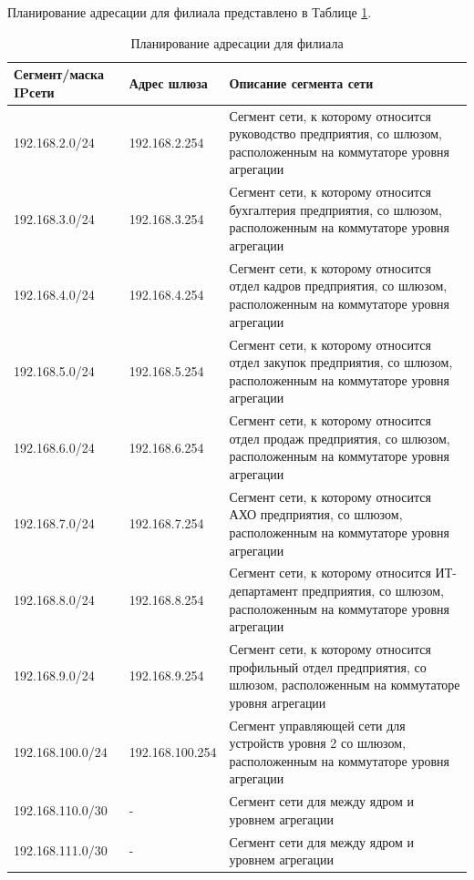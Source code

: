 \documentclass[14pt, a4paper]{extarticle}
\numberwithin{equation}{section}
\begin{document}
Планирование адресации для филиала представлено в Таблице \ref{table:filialIpPlan}.
\begin{table}[H]
\centering
\small
\caption{Планирование адресации для филиала}
\label{table:filialIpPlan}
\begin{tabular}{|m{4cm}|m{3cm}|m{8cm}|}
\hline
\textbf{Сегмент/маска IPсети} & \textbf{Адрес шлюза} & \textbf{Описание сегмента сети} \\
\hline
192.168.2.0/24 & 192.168.2.254 & Сегмент сети, к которому относится руководство предприятия, со шлюзом, расположенным на коммутаторе уровня агрегации
\\ \hline
192.168.3.0/24 & 192.168.3.254 & Сегмент сети, к которому относится бухгалтерия предприятия, со шлюзом, расположенным на коммутаторе уровня агрегации
\\ \hline
192.168.4.0/24 & 192.168.4.254 & Сегмент сети, к которому относится отдел кадров предприятия, со шлюзом, расположенным на коммутаторе уровня агрегации
\\ \hline
192.168.5.0/24 & 192.168.5.254 & Сегмент сети, к которому относится отдел закупок предприятия, со шлюзом, расположенным на коммутаторе уровня агрегации
\\ \hline
192.168.6.0/24 & 192.168.6.254 & Сегмент сети, к которому относится отдел продаж предприятия, со шлюзом, расположенным на коммутаторе уровня агрегации
\\ \hline
192.168.7.0/24 & 192.168.7.254 & Сегмент сети, к которому относится АХО предприятия, со шлюзом, расположенным на коммутаторе уровня агрегации
\\ \hline
192.168.8.0/24 & 192.168.8.254 & Сегмент сети, к которому относится ИТ-департамент предприятия, со шлюзом, расположенным на коммутаторе уровня агрегации
\\ \hline
192.168.9.0/24 & 192.168.9.254 & Сегмент сети, к которому относится профильный отдел предприятия, со шлюзом, расположенным на коммутаторе уровня агрегации
\\ \hline
192.168.100.0/24 & 192.168.100.254 & Сегмент управляющей сети для устройств уровня 2 со шлюзом, расположенным на коммутаторе уровня агрегации 
\\ \hline
192.168.110.0/30 & - & Сегмент сети для между ядром и уровнем агрегации
\\ \hline
192.168.111.0/30 & - & Сегмент сети для между ядром и уровнем агрегации
\\ \hline
\end{tabular}
\end{table}
\end{document}
